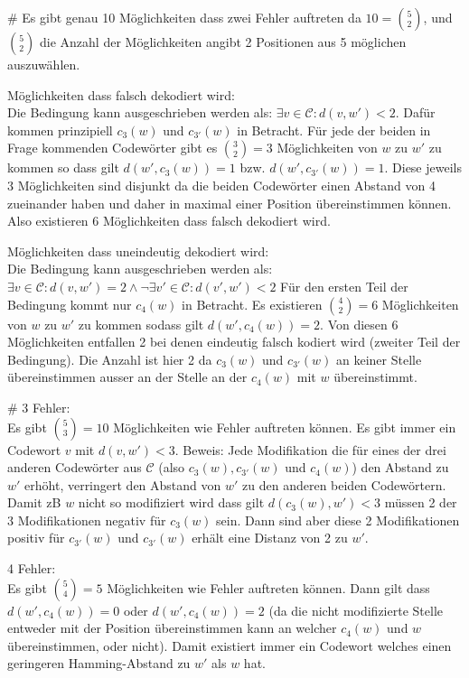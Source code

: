 \begin{myList}
#
Es gibt genau 10 Möglichkeiten dass zwei Fehler auftreten da $10 = \binom{5}{2}$, und $\binom{5}{2}$ die Anzahl der Möglichkeiten angibt 2 Positionen aus 5 möglichen auszuwählen.\medskip

Möglichkeiten dass falsch dekodiert wird:\\
Die Bedingung kann ausgeschrieben werden als: $\exists v \in \mathcal{C}: d(v,w') < 2$.
Dafür kommen prinzipiell $c_{3}(w)$ und $c_{3'}(w)$ in Betracht.
Für jede der beiden in Frage kommenden Codewörter gibt es $\binom{3}{2} = 3$ Möglichkeiten von $w$ zu $w'$ zu kommen so dass gilt $d(w',c_3(w)) = 1$ bzw. $d(w',c_{3'}(w)) = 1$.
Diese jeweils 3 Möglichkeiten sind disjunkt da die beiden Codewörter einen Abstand von 4 zueinander haben und daher in maximal einer Position übereinstimmen können.
Also existieren 6 Möglichkeiten dass falsch dekodiert wird.
\medskip

Möglichkeiten dass uneindeutig dekodiert wird:\\
Die Bedingung kann ausgeschrieben werden als: $\exists v \in \mathcal{C}: d(v,w') = 2 \wedge \neg \exists v' \in \mathcal{C}: d(v',w') < 2$
Für den ersten Teil der Bedingung kommt nur $c_4(w)$ in Betracht.
Es existieren $\binom{4}{2} = 6$ Möglichkeiten von $w$ zu $w'$ zu kommen sodass gilt $d(w',c_4(w)) = 2$.
Von diesen 6 Möglichkeiten entfallen 2 bei denen eindeutig falsch kodiert wird (zweiter Teil der Bedingung).
Die Anzahl ist hier 2 da $c_3(w)$ und $c_{3'}(w)$ an keiner Stelle übereinstimmen ausser an der Stelle an der $c_4(w)$ mit $w$ übereinstimmt.

#
3 Fehler:\\
Es gibt $\binom{5}{3} = 10$ Möglichkeiten wie Fehler auftreten können.
Es gibt immer ein Codewort $v$ mit $d(v,w') < 3$.
Beweis:
Jede Modifikation die für eines der drei anderen Codewörter aus $\mathcal{C}$ (also $c_3(w),c_{3'}(w)$ und $c_4(w)$) den Abstand zu $w'$ erhöht, verringert den Abstand von $w'$ zu den anderen beiden Codewörtern.
Damit zB $w$ nicht so modifiziert wird dass gilt $ d(c_3(w),w') < 3$ müssen 2 der 3 Modifikationen negativ für $c_3(w)$ sein.
Dann sind aber diese 2 Modifikationen positiv für $c_{3'}(w)$ und $c_{3'}(w)$ erhält eine Distanz von 2 zu $w'$.
\medskip

4 Fehler:\\
Es gibt $\binom{5}{4} = 5$ Möglichkeiten wie Fehler auftreten können.
Dann gilt dass $d(w',c_4(w)) = 0$ oder $d(w',c_4(w)) = 2$ (da die nicht modifizierte Stelle entweder mit der Position übereinstimmen kann an welcher $c_4(w)$ und $w$ übereinstimmen, oder nicht).
Damit existiert immer ein Codewort welches einen geringeren Hamming-Abstand zu $w'$ als $w$ hat.
\medskip


\end{myList}
